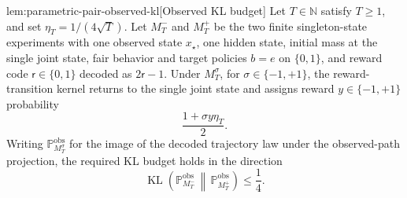 \documentclass[11pt]{article}
\begin{document}
\begin{lemmav}{lem:parametric-pair-observed-kl}[Observed KL budget]
Let \(T\in\mathbb N\) satisfy \(T\ge 1\), and set \(\eta_T=1/(4\sqrt T)\). Let \(M_T^{-}\) and \(M_T^{+}\) be the two finite singleton-state experiments with one observed state \(x_\star\), one hidden state, initial mass at the single joint state, fair behavior and target policies \(b=e\) on \(\{0,1\}\), and reward code \(\mathsf r\in\{0,1\}\) decoded as \(2\mathsf r-1\). Under \(M_T^\sigma\), for \(\sigma\in\{-1,+1\}\), the reward-transition kernel returns to the single joint state and assigns reward \(y\in\{-1,+1\}\) probability
\[
\frac{1+\sigma y\eta_T}{2}.
\]
Writing \(\mathbb P^{\mathrm{obs}}_{M_T^\sigma}\) for the image of the decoded trajectory law under the observed-path projection, the required KL budget holds in the direction
\[
\operatorname{KL}\!\left(
\mathbb P^{\mathrm{obs}}_{M_T^-}
\,\middle\|\,
\mathbb P^{\mathrm{obs}}_{M_T^+}
\right)
\le \frac14 .
\]
\end{lemmav}
\end{document}

